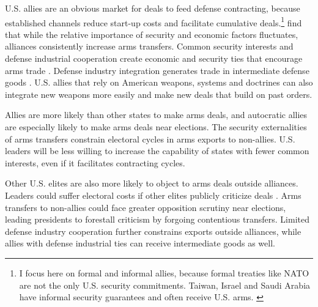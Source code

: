 \documentclass[12pt]{article}
\begin{document}


U.S. allies are an obvious market for deals to feed defense contracting, because established channels reduce start-up costs and facilitate cumulative deals.\footnote{I focus here on formal and informal allies, because formal treaties like NATO are not the only U.S. security commitments. Taiwan, Israel and Saudi Arabia have informal security guarantees and often receive U.S. arms. \citep{Yarhi-Miloetal2016}}
\citet{Thurneretal2019} find that while the relative importance of security and economic factors fluctuates, alliances consistently increase arms transfers.
Common security interests and defense industrial cooperation create economic and security ties that encourage arms trade \citep{Bitzinger1994}. 
Defense industry integration generates trade in intermediate defense goods \citep{Brooks2005}. 
U.S. allies that rely on American weapons, systems and doctrines can also integrate new weapons more easily and make new deals that build on past orders. 


Allies are more likely than other states to make arms deals, and autocratic allies are especially likely to make arms deals near elections. 
The security externalities of arms transfers constrain electoral cycles in arms exports to non-allies. 
U.S. leaders will be less willing to increase the capability of states with fewer common interests, even if it facilitates contracting cycles.


Other U.S. elites are also more likely to object to arms deals outside alliances.
Leaders could suffer electoral costs if other elites publicly criticize deals \citep{Saunders2022}.
Arms transfers to non-allies could face greater opposition scrutiny near elections, leading presidents to forestall criticism by forgoing contentious transfers.
Limited defense industry cooperation further constrains exports outside alliances, while allies with defense industrial ties can receive intermediate goods as well.
\end{document}
